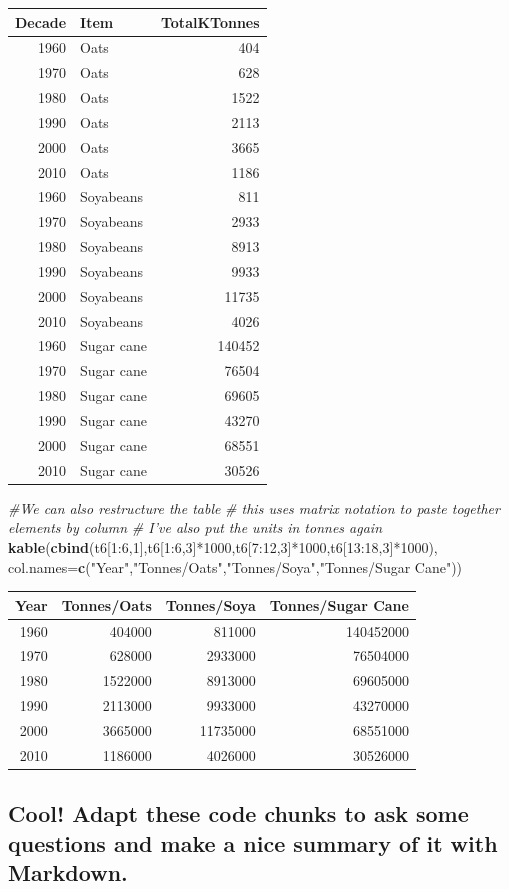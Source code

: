 \documentclass[]{article}
\newenvironment{Shaded}{\begin{snugshade}}{\end{snugshade}}
\newcommand{\KeywordTok}[1]{\textcolor[rgb]{0.13,0.29,0.53}{\textbf{{#1}}}}
\newcommand{\DataTypeTok}[1]{\textcolor[rgb]{0.13,0.29,0.53}{{#1}}}
\newcommand{\DecValTok}[1]{\textcolor[rgb]{0.00,0.00,0.81}{{#1}}}
\newcommand{\StringTok}[1]{\textcolor[rgb]{0.31,0.60,0.02}{{#1}}}
\newcommand{\CommentTok}[1]{\textcolor[rgb]{0.56,0.35,0.01}{\textit{{#1}}}}
\newcommand{\NormalTok}[1]{{#1}}
\begin{document}
\begin{longtable}[]{@{}rlr@{}}
\toprule
Decade & Item & TotalKTonnes\tabularnewline
\midrule
\endhead
1960 & Oats & 404\tabularnewline
1970 & Oats & 628\tabularnewline
1980 & Oats & 1522\tabularnewline
1990 & Oats & 2113\tabularnewline
2000 & Oats & 3665\tabularnewline
2010 & Oats & 1186\tabularnewline
1960 & Soyabeans & 811\tabularnewline
1970 & Soyabeans & 2933\tabularnewline
1980 & Soyabeans & 8913\tabularnewline
1990 & Soyabeans & 9933\tabularnewline
2000 & Soyabeans & 11735\tabularnewline
2010 & Soyabeans & 4026\tabularnewline
1960 & Sugar cane & 140452\tabularnewline
1970 & Sugar cane & 76504\tabularnewline
1980 & Sugar cane & 69605\tabularnewline
1990 & Sugar cane & 43270\tabularnewline
2000 & Sugar cane & 68551\tabularnewline
2010 & Sugar cane & 30526\tabularnewline
\bottomrule
\end{longtable}

\newpage

\begin{Shaded}
\begin{Highlighting}[]
\CommentTok{#We can also restructure the table}
\CommentTok{# this uses matrix notation to paste together elements by column}
\CommentTok{# I've also put the units in tonnes again}
\KeywordTok{kable}\NormalTok{(}\KeywordTok{cbind}\NormalTok{(t6[}\DecValTok{1}\NormalTok{:}\DecValTok{6}\NormalTok{,}\DecValTok{1}\NormalTok{],t6[}\DecValTok{1}\NormalTok{:}\DecValTok{6}\NormalTok{,}\DecValTok{3}\NormalTok{]*}\DecValTok{1000}\NormalTok{,t6[}\DecValTok{7}\NormalTok{:}\DecValTok{12}\NormalTok{,}\DecValTok{3}\NormalTok{]*}\DecValTok{1000}\NormalTok{,t6[}\DecValTok{13}\NormalTok{:}\DecValTok{18}\NormalTok{,}\DecValTok{3}\NormalTok{]*}\DecValTok{1000}\NormalTok{),}
      \DataTypeTok{col.names=}\KeywordTok{c}\NormalTok{(}\StringTok{"Year"}\NormalTok{,}\StringTok{"Tonnes/Oats"}\NormalTok{,}\StringTok{"Tonnes/Soya"}\NormalTok{,}\StringTok{"Tonnes/Sugar Cane"}\NormalTok{))}
\end{Highlighting}
\end{Shaded}

\begin{longtable}[]{@{}rrrr@{}}
\toprule
Year & Tonnes/Oats & Tonnes/Soya & Tonnes/Sugar Cane\tabularnewline
\midrule
\endhead
1960 & 404000 & 811000 & 140452000\tabularnewline
1970 & 628000 & 2933000 & 76504000\tabularnewline
1980 & 1522000 & 8913000 & 69605000\tabularnewline
1990 & 2113000 & 9933000 & 43270000\tabularnewline
2000 & 3665000 & 11735000 & 68551000\tabularnewline
2010 & 1186000 & 4026000 & 30526000\tabularnewline
\bottomrule
\end{longtable}

\subsection{Cool! Adapt these code chunks to ask some questions and make
a nice summary of it with
Markdown.}\label{cool-adapt-these-code-chunks-to-ask-some-questions-and-make-a-nice-summary-of-it-with-markdown.}
\end{document}
